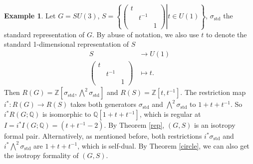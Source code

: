 \documentclass[11pt]{amsart}
\theoremstyle{plain}
\theoremstyle{definition}
\newtheorem{example}[theorem]{Example}
\begin{document}
\begin{example}\label{isoex}
	Let $G=SU(3)$, $\displaystyle S=\left.\left\{\begin{pmatrix}t& &\\ &t^{-1}& \\ &&1\end{pmatrix}\right|t\in U(1)\right\}$, $\sigma_{\text{std}}$ the standard representation of $G$. By abuse of notation, we also use $t$ to denote the standard 1-dimensional representation of $S$
	\begin{align*}
		S&\to U(1)\\
		\begin{pmatrix}t& &\\ &t^{-1}& \\ &&1\end{pmatrix}&\mapsto t.
	\end{align*}
	Then $\displaystyle R(G)=\mathbb{Z}[\sigma_{\text{std}}, \bigwedge\nolimits^2\sigma_{\text{std}}]$ and $R(S)=\mathbb{Z}[t, t^{-1}]$. The restriction map $i^*: R(G)\to R(S)$ takes both generators $\sigma_{\text{std}}$ and $\displaystyle\bigwedge\nolimits^2\sigma_{\text{std}}$ to $1+t+t^{-1}$. So $i^*R(G; \mathbb{Q})$ is isomorphic to $\mathbb{Q}[1+t+t^{-1}]$, which is regular at $I=i^*I(G; \mathbb{Q})=(t+t^{-1}-2)$. By Theorem \ref{rep}, $(G, S)$ is an isotropy formal pair. Alternatively, as mentioned before, both restrictions $i^*\sigma_{\text{std}}$ and $i^*\bigwedge\nolimits^2\sigma_{\text{std}}$ are $1+t+t^{-1}$, which is self-dual. By Theorem \ref{circle}, we can also get the isotropy formality of $(G, S)$.
	

\end{example}
\end{document}
